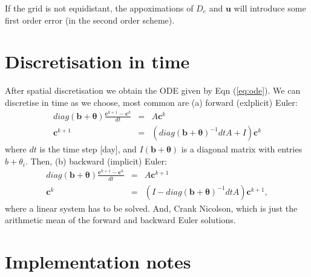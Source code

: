 \documentclass[a4paper,10pt]{article}
\begin{document}
If the grid is not equidistant, the appoximations of $D_e$ and $\mathbf{u}$ will introduce some first order error (in the second order scheme). 


\section{Discretisation in time}

After spatial discretisation we obtain the ODE given by Eqn (\ref{eq:ode}). We can discretise in time as we choose, most common are (a) forward (exlplicit) Euler:
\begin{eqnarray}
 diag(\mathbf{b}+\mathbf{\theta}) \frac{\mathbf{c}^{k+1}-\mathbf{c}^k}{dt} &=& A \mathbf{c}^k \\
\mathbf{c}^{k+1} &=& (diag(\mathbf{b}+\mathbf{\theta})^{-1} dt A + I)\mathbf{c}^k  
\end{eqnarray}
where $dt$ is the time step [day], and $ I(\mathbf{b}+\mathbf{\theta})$ is a diagonal matrix with entries $b+\theta_i$. Then, (b) backward (implicit) Euler:
\begin{eqnarray}
 diag(\mathbf{b}+\mathbf{\theta}) \frac{\mathbf{c}^{k+1}-\mathbf{c}^k}{dt} &=& A \mathbf{c}^{k+1} \\
  \mathbf{c}^{k} &=& (I-diag(\mathbf{b}+\mathbf{\theta})^{-1} dt A ) \mathbf{c}^{k+1} ,  
\end{eqnarray}
where a linear system has to be solved. And, Crank Nicolson, which is just the arithmetic mean of the forward and backward Euler solutions. 


\section{Implementation notes}
\end{document}
